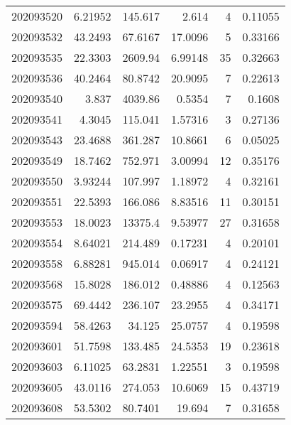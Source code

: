 \begin{tabular}{rrrrrr}
 202093520 &          6.21952 &      145.617  &            2.614   &           4 & 0.11055 \\
 202093532 &         43.2493  &       67.6167 &           17.0096  &           5 & 0.33166 \\
 202093535 &         22.3303  &     2609.94   &            6.99148 &          35 & 0.32663 \\
 202093536 &         40.2464  &       80.8742 &           20.9095  &           7 & 0.22613 \\
 202093540 &          3.837   &     4039.86   &            0.5354  &           7 & 0.1608  \\
 202093541 &          4.3045  &      115.041  &            1.57316 &           3 & 0.27136 \\
 202093543 &         23.4688  &      361.287  &           10.8661  &           6 & 0.05025 \\
 202093549 &         18.7462  &      752.971  &            3.00994 &          12 & 0.35176 \\
 202093550 &          3.93244 &      107.997  &            1.18972 &           4 & 0.32161 \\
 202093551 &         22.5393  &      166.086  &            8.83516 &          11 & 0.30151 \\
 202093553 &         18.0023  &    13375.4    &            9.53977 &          27 & 0.31658 \\
 202093554 &          8.64021 &      214.489  &            0.17231 &           4 & 0.20101 \\
 202093558 &          6.88281 &      945.014  &            0.06917 &           4 & 0.24121 \\
 202093568 &         15.8028  &      186.012  &            0.48886 &           4 & 0.12563 \\
 202093575 &         69.4442  &      236.107  &           23.2955  &           4 & 0.34171 \\
 202093594 &         58.4263  &       34.125  &           25.0757  &           4 & 0.19598 \\
 202093601 &         51.7598  &      133.485  &           24.5353  &          19 & 0.23618 \\
 202093603 &          6.11025 &       63.2831 &            1.22551 &           3 & 0.19598 \\
 202093605 &         43.0116  &      274.053  &           10.6069  &          15 & 0.43719 \\
 202093608 &         53.5302  &       80.7401 &           19.694   &           7 & 0.31658 \\

\end{tabular}
